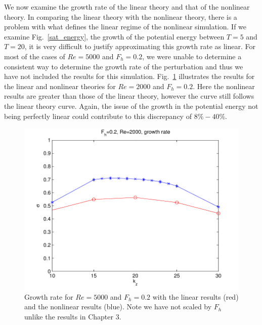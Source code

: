 We now examine the growth rate of the linear theory and that of the nonlinear theory. In comparing the linear theory with the nonlinear theory, there is a problem with what defines the linear regime of the nonlinear simulation. If we examine Fig.~\ref{sat_energy}, the growth of the potential energy between $T=5$ and $T=20$, it is very difficult to justify approximating this growth rate as linear. For most of the cases of $Re=5000$ and $F_{h}=0.2$, we were unable to determine a consistent way to determine the growth rate of the perturbation and thus we have not included the results for this simulation. Fig.~\ref{growth_rates_nonlinear} illustrates the results for the linear and nonlinear theories for $Re=2000$ and $F_{h}=0.2$. Here the nonlinear results are greater than those of the linear theory, however the curve still follows the linear theory curve. Again, the issue of the growth in the potential energy not being perfectly linear could contribute to this discrepancy of $8\%-40\%$. 

\begin{figure}
\begin{center}
\includegraphics[width=\textwidth]{re2000_fh02_growth_rates} 
\caption{Growth rate for $Re=5000$ and $F_{h}=0.2$ with the linear results (red) and the nonlinear results (blue). Note we have not scaled by $F_{h}$ unlike the results in Chapter 3.}
\label{growth_rates_nonlinear}
\end{center}
\end{figure}

